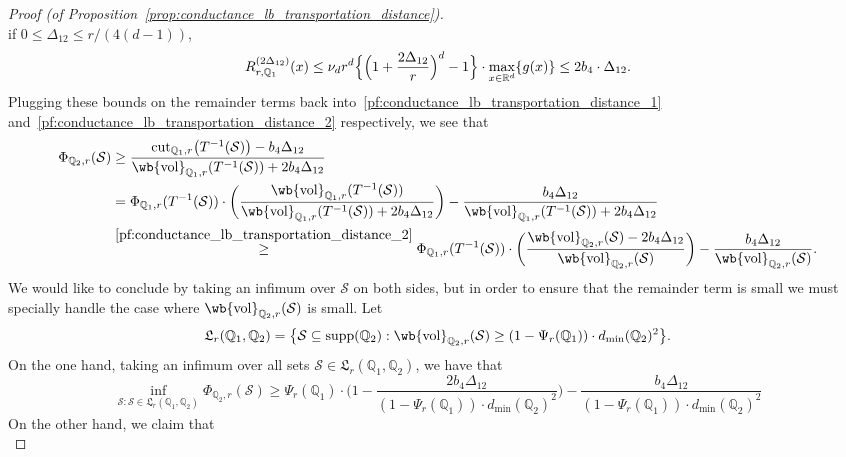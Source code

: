 \documentclass{article}
\newcommand{\Reals}{\mathbb{R}}
\newcommand{\vol}{\mathrm{vol}}
\newcommand{\cut}{\mathrm{cut}}
\newcommand{\1}{\mathbf{1}}
\newcommand{\Rd}{\Reals^d}
\newcommand{\mc}[1]{\mathcal{#1}}
\newcommand{\mbb}[1]{\mathbb{#1}}
\theoremstyle{definition}
\theoremstyle{remark}
\begin{document}
\begin{proof}[Proof (of Proposition~\ref{prop:conductance_lb_transportation_distance})]
\begin{equation*}
	\end{equation*}
	if $0 \leq \Delta_{12} \leq r/(4(d - 1))$,
	\begin{equation*}
	R_{r,\mbb{Q}_1}^{(2\Delta_{12})}(x) \leq \nu_dr^d\Bigl\{\Bigl(1 + \frac{2\Delta_{12}}{r}\Bigr)^d - 1\Bigr\} \cdot \max_{x \in \Rd}\{g(x)\} \leq 2 b_4 \cdot \Delta_{12}.
	\end{equation*} 
	Plugging these bounds on the remainder terms back into~\eqref{pf:conductance_lb_transportation_distance_1} and~\eqref{pf:conductance_lb_transportation_distance_2} respectively, we see that
	\begin{align*}
	\Phi_{\mbb{Q}_2,r}(\mc{S}) & \geq \frac{\cut_{\mbb{Q}_1,r}\bigl(T^{-1}(\mc{S})\bigr) - b_4 \Delta_{12}}{\wb{\vol}_{\mbb{Q}_1,r}(T^{-1}(\mc{S})) + 2b_4 \Delta_{12}} \\ & = \Phi_{\mbb{Q}_1,r}(T^{-1}(\mc{S})) \cdot \biggl(\frac{\wb{\vol}_{\mbb{Q}_1,r}(T^{-1}(\mc{S}))}{\wb{\vol}_{\mbb{Q}_1,r}(T^{-1}(\mc{S})) + 2b_4\Delta_{12}}\biggr) - \frac{b_4\Delta_{12}}{\wb{\vol}_{\mbb{Q}_1,r}(T^{-1}(\mc{S})) + 2b_4\Delta_{12}} \\
	& \overset{\eqref{pf:conductance_lb_transportation_distance_2}}{\geq} \Phi_{\mbb{Q}_1,r}(T^{-1}(\mc{S})) \cdot \biggl(\frac{\wb{\vol}_{\mbb{Q}_2,r}(\mc{S}) - 2b_4\Delta_{12}}{\wb{\vol}_{\mbb{Q}_2,r}(\mc{S})}\biggr) - \frac{b_4\Delta_{12}}{\wb{\vol}_{\mbb{Q}_2,r}(\mc{S})}.
	\end{align*}
	We would like to conclude by taking an infimum over $\mc{S}$ on both sides, but in order to ensure that the remainder term is small we must specially handle the case where $\wb{\vol}_{\mbb{Q}_2,r}(\mc{S})$ is small. Let
	\begin{equation*}
	\mathfrak{L}_{r}(\mbb{Q}_1,\mbb{Q}_2) = \bigl\{\mc{S} \subseteq \mathrm{supp}(\mbb{Q}_2): \wb{\vol}_{\mbb{Q}_2,r}(\mc{S}) \geq (1 - \Psi_r(\mbb{Q}_1)) \cdot d_{\min}(\mbb{Q}_2)^2 \bigr\}.
	\end{equation*}
	On the one hand, taking an infimum over all sets $\mc{S} \in \mathfrak{L}_{r}(\mbb{Q}_1,\mbb{Q}_2)$, we have that
	\begin{equation*}
	\inf_{\mc{S}: \mc{S} \in \mathfrak{L}_{r}(\mbb{Q}_1,\mbb{Q}_2)} \Phi_{\mbb{Q}_2,r}(\mc{S}) \geq \Psi_{r}(\mbb{Q}_1) \cdot \biggl(1 - \frac{2 b_4 \Delta_{12}}{(1 - \Psi_r(\mbb{Q}_1)) \cdot d_{\min}(\mbb{Q}_2)^2}\biggr) - \frac{b_4\Delta_{12}}{(1 - \Psi_r(\mbb{Q}_1)) \cdot d_{\min}(\mbb{Q}_2)^2}
	\end{equation*}
	On the other hand, we claim that 
	\begin{equation}

\end{equation}
\end{proof}
\end{document}
